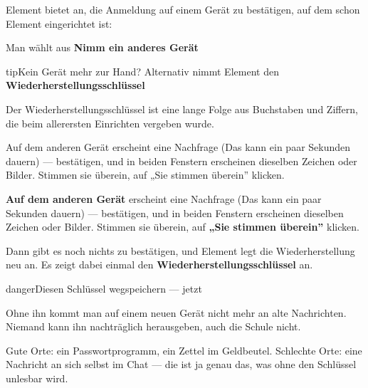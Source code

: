 \documentclass[11pt,parskip=half]{scrartcl}
\begin{document}
\begin{reiter}


Element bietet an, die Anmeldung auf einem Gerät zu bestätigen, auf dem schon Element eingerichtet ist:

Man wählt aus \textbf{Nimm ein anderes Gerät}

\begin{kasten}{tip}{Kein Gerät mehr zur Hand? Alternativ nimmt Element den
\textbf{Wiederherstellungsschlüssel}}

Der Wiederherstellungsschlüssel ist eine lange
Folge aus Buchstaben und Ziffern, die beim allerersten Einrichten vergeben
wurde.


\end{kasten}

Auf dem anderen Gerät erscheint eine Nachfrage (Das kann ein paar Sekunden dauern) — bestätigen, und in beiden Fenstern erscheinen dieselben Zeichen oder Bilder. Stimmen sie überein, auf „Sie stimmen überein” klicken.


\textbf{Auf dem anderen Gerät} erscheint eine Nachfrage (Das kann ein paar Sekunden dauern) — bestätigen, und in beiden Fenstern erscheinen
dieselben Zeichen oder Bilder. Stimmen sie überein, auf \textbf{„Sie stimmen
überein”} klicken.





Dann gibt es noch nichts zu bestätigen, und Element legt die Wiederherstellung
neu an. Es zeigt dabei einmal den \textbf{Wiederherstellungsschlüssel} an.

\begin{kasten}{danger}{Diesen Schlüssel wegspeichern — jetzt}

Ohne ihn kommt man auf einem neuen Gerät nicht mehr an alte Nachrichten.
Niemand kann ihn nachträglich herausgeben, auch die Schule nicht.

Gute Orte: ein Passwortprogramm, ein
Zettel im Geldbeutel. Schlechte Orte: eine Nachricht an sich selbst im
Chat — die ist ja genau das, was ohne den Schlüssel unlesbar wird.

\end{kasten}

\end{reiter}
\end{document}
